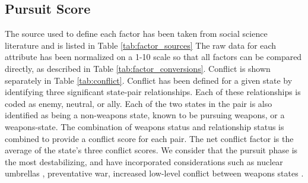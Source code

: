 \subsection{Pursuit Score}\label{s_pe}
The source used to define each factor has been taken from social science literature and is listed in Table \ref{tab:factor_sources} The raw data for each attribute has been normalized on a 1-10 scale so that all factors can be compared directly, as described in Table \ref{tab:factor_conversions}. Conflict is shown separately in Table \ref{tab:conflict}. Conflict has been defined for a given state by identifying three significant state-pair relationships.  Each of these relationships is coded as enemy, neutral, or ally.  Each of the two states in the pair is also identified as being a non-weapons state, known to be pursuing weapons, or a weapons-state.  The combination of weapons status and relationship status is combined to provide a conflict score for each pair. The net conflict factor is the average of the state's three conflict scores. We consider that the pursuit phase is the most destabilizing, and have incorporated considerations such as nuclear umbrellas ,  preventative war, increased low-level conflict between weapons states \cite{geller_nuclear_1990, fuhrmann_targeting_2010, bell_questioning_2013-1}.

